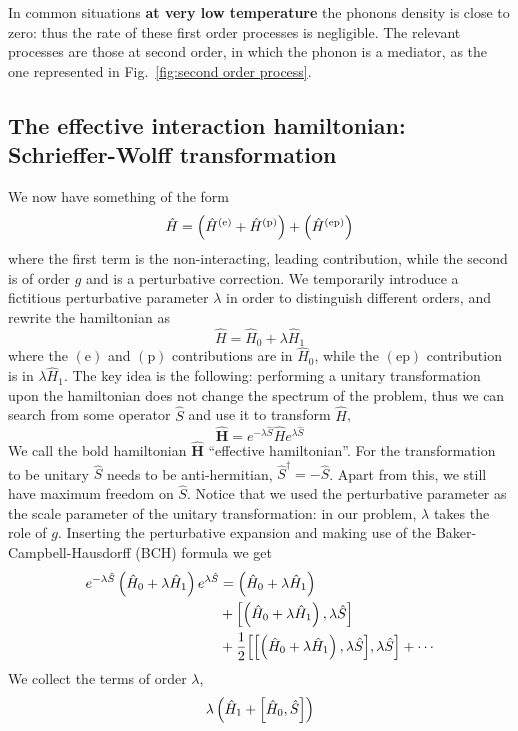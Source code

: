 In common situations \textbf{at very low temperature} the phonons density is close to zero: thus the rate of these first order processes is negligible. The relevant processes are those at second order, in which the phonon is a mediator, as the one represented in Fig.~\ref{fig:second order process}.

\subsection{The effective interaction hamiltonian: Schrieffer-Wolff transformation}

We now have something of the form
\[
	\hat H = \left({\hat H^{(\mathrm{e})} + \hat H^{(\mathrm{p})}}\right) + \left({\hat H^{(\mathrm{ep})}}\right)
\]
where the first term is the non-interacting, leading contribution, while the second is of order $g$ and is a perturbative correction. We temporarily introduce a fictitious perturbative parameter $\lambda$ in order to distinguish different orders, and rewrite the hamiltonian as
\[
	\hat H = \hat H_0 + \lambda \hat H_1
\]
where the ${(\mathrm{e})}$ and ${(\mathrm{p})}$ contributions are in $\hat H_0$, while the ${(\mathrm{ep})}$ contribution is in $\lambda \hat H_1$.
The key idea is the following: performing a unitary transformation upon the hamiltonian does not change the spectrum of the problem, thus we can search from some operator $\hat S$ and use it to transform $\hat H$,
\[
	\hat{\bm{H}} = e^{-\lambda \hat S} \hat H e^{\lambda \hat S}
\]
We call the bold hamiltonian $\hat{\bm{H}}$ ``effective hamiltonian''. For the transformation to be unitary $\hat S$ needs to be anti-hermitian, $\hat S^\dagger = - \hat S$. Apart from this, we still have maximum freedom on $\hat S$. Notice that we used the perturbative parameter as the scale parameter of the unitary transformation: in our problem, $\lambda$ takes the role of $g$. Inserting the perturbative expansion and making use of the Baker-Campbell-Hausdorff (BCH) formula we get
\begin{align}
	e^{-\lambda \hat S} \lrR{\hat H_0 + \lambda \hat H_1} e^{\lambda \hat S} &= \lrR{\hat H_0 + \lambda \hat H_1} \label{eq:schrieffer wolf expansion} \\
	&+ \comm{\lrR{\hat H_0 + \lambda \hat H_1}}{\lambda\hat S} \nonumber \\
	&+ \half \comm{\comm{\lrR{\hat H_0 + \lambda \hat H_1}}{\lambda\hat S}}{\lambda\hat S \vphantom{A^A}} + \cdots \nonumber 
\end{align}
We collect the terms of order $\lambda$,
\[
	\lambda \lrR{\hat H_1 + \comm{\hat H_0}{\hat S}}
\]
